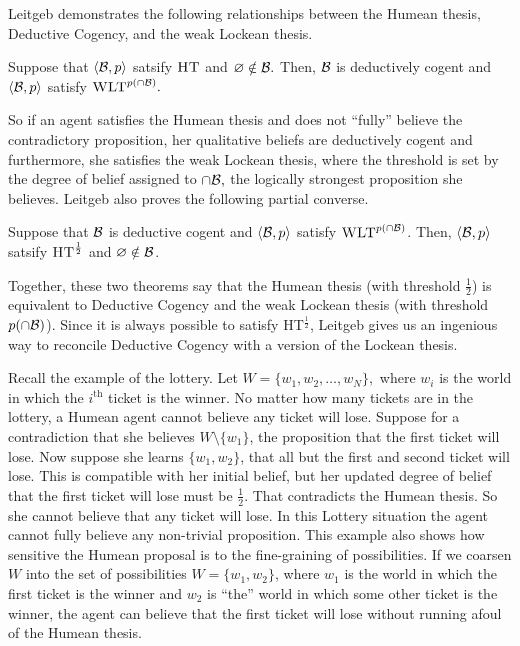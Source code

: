 Leitgeb demonstrates the following relationships between the Humean thesis,
Deductive Cogency, and the weak Lockean thesis.
\begin{theorem}
  Suppose that $\langle \mathcal{B}, p \rangle$ satsify $\textsc{HT}$ and $\varnothing
  \notin \mathcal{B}.$ Then, $\mathcal{B}$ is deductively cogent and $\langle \mathcal{B}, p\rangle$
  satisfy $\textsc{WLT}^{p(\cap \mathcal{B})}.$
\end{theorem}
So if an agent satisfies the Humean thesis and does not ``fully'' believe the
contradictory proposition, her qualitative beliefs are deductively cogent and
furthermore, she satisfies the weak Lockean thesis, where the threshold is set
by the degree of belief assigned to $\cap\mathcal{B},$ the logically strongest
proposition she believes. Leitgeb also proves the following partial converse.
\begin{theorem}
Suppose that $\mathcal{B}$ is deductive cogent and $\langle \mathcal{B}, p \rangle$ satisfy
$\textsc{WLT}^{p(\cap \mathcal{B})}$. Then, $\langle \mathcal{B}, p \rangle$ satsify
$\textsc{HT}^{\frac{1}{2}}$ and $\varnothing \notin \mathcal{B}$.
\end{theorem}
Together, these two theorems say that the Humean thesis (with threshold
$\frac{1}{2}$) is equivalent to Deductive Cogency and the weak Lockean thesis
(with threshold $p(\cap\mathcal{B})$). Since it is always possible to satisfy
HT$^\frac{1}{2}$, Leitgeb gives us an ingenious way to reconcile Deductive
Cogency with a version of the Lockean thesis.

Recall the example of the lottery. Let $W=\{w_1, w_2, \ldots, w_N \},$ where
$w_i$ is the world in which the $i^{\text{th}}$ ticket is the winner.  No matter
how many tickets are in the lottery, a Humean agent cannot believe any ticket
will lose. Suppose for a contradiction that she believes $W\setminus \{w_1\}$,
the proposition that the first ticket will lose. Now suppose she learns $\{w_1,
w_2\}$, that all but the first and second ticket will lose. This is compatible
with her initial belief, but her updated degree of belief that the first ticket
will lose must be $\frac{1}{2}$. That contradicts the Humean thesis. So she
cannot believe that any ticket will lose. In this Lottery situation the agent
cannot fully believe any non-trivial proposition. This example also shows how
sensitive the Humean proposal is to the fine-graining of possibilities. If we
coarsen $W$ into the set of possibilities $W=\{w_1, w_2\}$, where $w_1$ is the
world in which the first ticket is the winner and $w_2$ is ``the'' world in
which some other ticket is the winner, the agent can believe that the first
ticket will lose without running afoul of the Humean thesis.  

